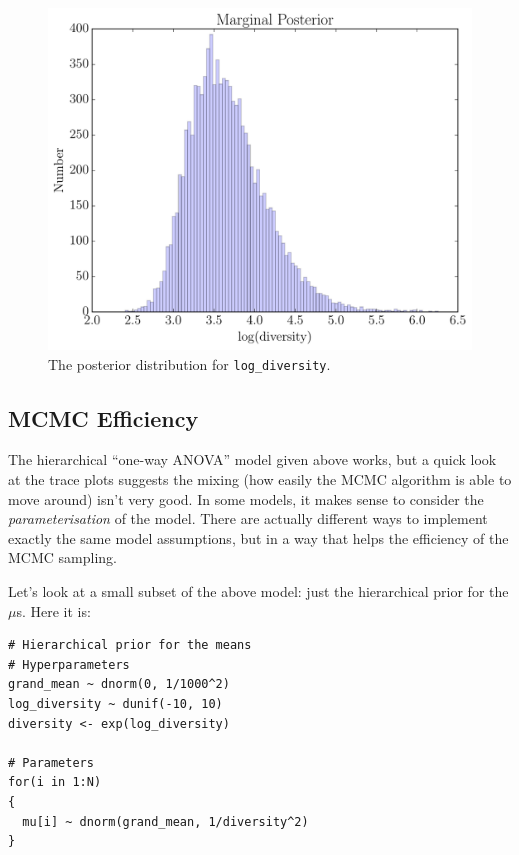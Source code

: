 \begin{figure}[ht!]
\begin{center}
\includegraphics[scale=0.6]{Figures/diversity.pdf}
\caption{The posterior distribution for {\tt log\_diversity}.\label{fig:diversity}}
\end{center}
\end{figure}

\subsection{MCMC Efficiency}
The hierarchical ``one-way ANOVA'' model given above works, but a quick look
at the trace plots suggests the mixing (how easily the MCMC algorithm is
able to move around) isn't very good. In some models, it makes sense to
consider the {\it parameterisation} of the model. There are actually different
ways to implement exactly the same model assumptions, but in a way that helps
the efficiency of the MCMC sampling.

Let's look at a small subset of the above model: just the hierarchical prior
for the $\mu$s. Here it is:

\begin{verbatim}
# Hierarchical prior for the means
# Hyperparameters
grand_mean ~ dnorm(0, 1/1000^2)
log_diversity ~ dunif(-10, 10)
diversity <- exp(log_diversity)

# Parameters
for(i in 1:N)
{
  mu[i] ~ dnorm(grand_mean, 1/diversity^2)
}
\end{verbatim}

